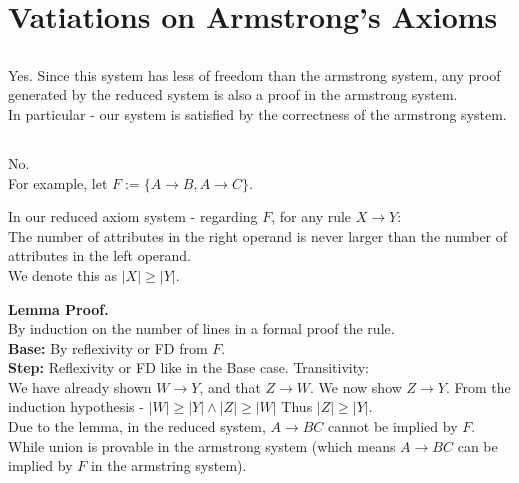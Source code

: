 \section{Vatiations on Armstrong's Axioms}
\subsection{}
Yes. Since this system has less of freedom than the armstrong system,
any proof generated by the reduced system is also a proof in the armstrong system.\\
In particular - our system is satisfied by the correctness of the armstrong system.

\subsection{}
No.\\
For example, let $F:=\{A\rightarrow B, A\rightarrow C\}$.\\

\begin{lemma}
	In our reduced axiom system - regarding $F$, for any rule $X\rightarrow Y$:\\
	The number of attributes in the right operand is never
	larger than the number of attributes in the left operand.\\
	We denote this as $|X|\geq |Y|$.
\end{lemma}
\textbf{Lemma Proof.}\\
By induction on the number of lines in a formal proof the rule.\\
\textbf{Base:} By reflexivity or FD from $F$.\\
\textbf{Step:} Reflexivity or FD like in the Base case.
Transitivity:\\
We have already shown $W\rightarrow Y$, and that $Z\rightarrow W$. We now show
$Z\rightarrow Y$.
From the induction hypothesis - $|W|\geq |Y| \wedge |Z|\geq |W|$ Thus $|Z|\geq|Y|$.\\

Due to the lemma, in the reduced system, $A\rightarrow BC$ cannot be implied by $F$.
While union is provable in the armstrong system (which means $A\rightarrow BC$ can be implied by $F$ in the armstring system).